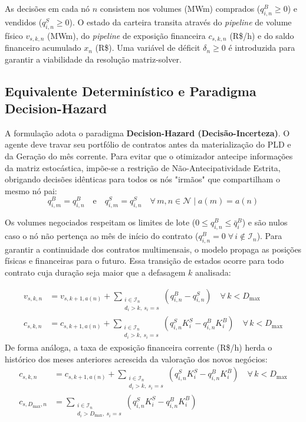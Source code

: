 As decisões em cada nó $n$ consistem nos volumes (MWm) comprados ($q_{i,n}^B \ge 0$) e vendidos ($q_{i,n}^S \ge 0$). O estado da carteira transita através do \textit{pipeline} de volume físico $v_{s,k,n}$ (MWm), do \textit{pipeline} de exposição financeira $c_{s,k,n}$ (R\$/h) e do saldo financeiro acumulado $x_n$ (R\$). Uma variável de déficit $\delta_n \ge 0$ é introduzida para garantir a viabilidade da resolução matriz-solver.

\subsection{Equivalente Determinístico e Paradigma Decision-Hazard}

A formulação adota o paradigma \textbf{Decision-Hazard (Decisão-Incerteza)}. O agente deve travar seu portfólio de contratos antes da materialização do PLD e da Geração do mês corrente. Para evitar que o otimizador antecipe informações da matriz estocástica, impõe-se a restrição de Não-Antecipatividade Estrita, obrigando decisões idênticas para todos os nós "irmãos" que compartilham o mesmo nó pai:
\begin{equation}
    q_{i,m}^B = q_{i,n}^B \quad \text{e} \quad q_{i,m}^S = q_{i,n}^S \quad \forall\, m, n \in \mathcal{N} \mid a(m) = a(n)
\end{equation}

Os volumes negociados respeitam os limites de lote ($0 \le q_{i,n}^B \le \bar{q}_i^B$) e são nulos caso o nó não pertença ao mês de início do contrato ($q_{i,n}^B = 0 \;\forall\, i \notin \mathcal{I}_n$). Para garantir a continuidade dos contratos multimensais, o modelo propaga as posições físicas e financeiras para o futuro. Essa transição de estados ocorre para todo contrato cuja duração seja maior que a defasagem $k$ analisada:

\begin{align}
    v_{s,k,n} &= v_{s,k+1,a(n)} + \sum_{\substack{i \in \mathcal{I}_n \\ d_i > k,\ s_i = s}} \left(q_{i,n}^B - q_{i,n}^S\right) \quad \forall\, k < D_{\max} \\
    c_{s,k,n} &= c_{s,k+1,a(n)} + \sum_{\substack{i \in \mathcal{I}_n \\ d_i > k,\ s_i = s}} \left(q_{i,n}^S K_i^S - q_{i,n}^B K_i^B\right) \quad \forall\, k < D_{\max}
\end{align}
De forma análoga, a taxa de exposição financeira corrente (R\$/h) herda o histórico dos meses anteriores acrescida da valoração dos novos negócios:
\begin{align}
    c_{s,k,n} &= c_{s,k+1,a(n)} + \sum_{\substack{i \in \mathcal{I}_n \\ d_i > k,\ s_i = s}} \left(q_{i,n}^S K_i^S - q_{i,n}^B K_i^B\right) \quad \forall\, k < D_{\max} \\
    c_{s,D_{\max},n} &= \sum_{\substack{i \in \mathcal{I}_n \\ d_i > D_{\max},\ s_i = s}} \left(q_{i,n}^S K_i^S - q_{i,n}^B K_i^B\right)
\end{align}

